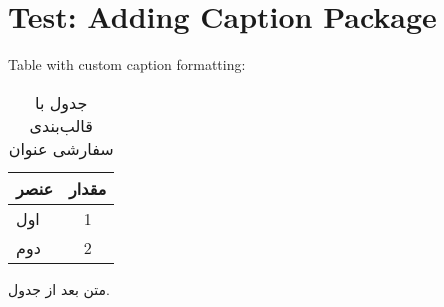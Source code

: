 \documentclass[12pt,a4paper]{article}
\newcommand{\fa}[1]{\textfarsi{#1}}
\newcommand{\en}[1]{\textenglish{#1}}
\begin{document}
\section*{Test: Adding Caption Package}

\en{Table with custom caption formatting:}

\begin{table}[H]
\centering
\captionsetup{font=small,labelfont=bf}
\begin{tabular}{lc}
\toprule
\fa{عنصر} & \fa{مقدار} \\
\midrule
\fa{اول} & 1 \\
\fa{دوم} & 2 \\
\bottomrule
\end{tabular}
\caption{\fa{جدول با قالب‌بندی سفارشی عنوان}}
\end{table}

\fa{متن بعد از جدول.}
\end{document}
